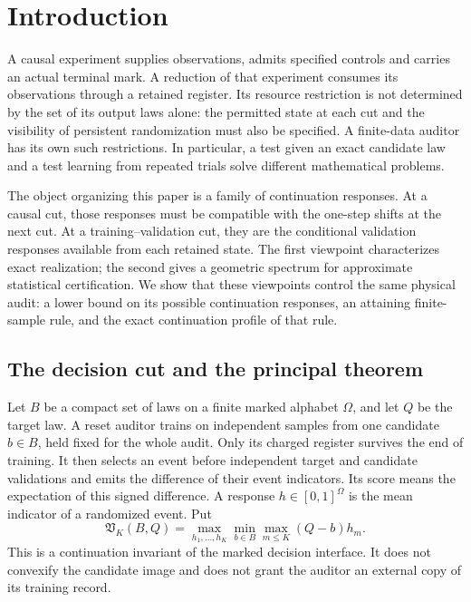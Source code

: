 \section{Introduction}
A causal experiment supplies observations, admits specified controls and
carries an actual terminal mark. A reduction of that experiment consumes
its observations through a retained register. Its resource restriction
is not determined by the set of its output laws alone: the permitted
state at each cut and the visibility of persistent randomization must
also be specified. A finite-data auditor has its own such restrictions.
In particular, a test given an exact candidate law and a test learning
from repeated trials solve different mathematical problems.

The object organizing this paper is a family of continuation responses.
At a causal cut, those responses must be compatible with the one-step
shifts at the next cut. At a training--validation cut, they are the
conditional validation responses available from each retained state.
The first viewpoint characterizes exact realization; the second gives a
geometric spectrum for approximate statistical certification. We show
that these viewpoints control the same physical audit: a lower bound on
its possible continuation responses, an attaining finite-sample rule,
and the exact continuation profile of that rule.

\subsection{The decision cut and the principal theorem}
Let $B$ be a compact set of laws on a finite marked alphabet $\Omega$,
and let $Q$ be the target law. A reset auditor trains on independent
samples from one candidate $b\in B$, held fixed for the whole audit.
Only its charged register survives the end of training. It then selects
an event before independent target and candidate validations and emits
the difference of their event indicators. Its score means the expectation
of this signed difference. A response $h\in[0,1]^\Omega$ is the mean
indicator of a randomized event. Put
\[
 \mathfrak V_K(B,Q)=\max_{h_1,\ldots,h_K}
          \min_{b\in B}\max_{m\le K}(Q-b)h_m.
\]
This is a continuation invariant of the marked decision interface.
It does not convexify the candidate image and does not grant the auditor
an external copy of its training record.

